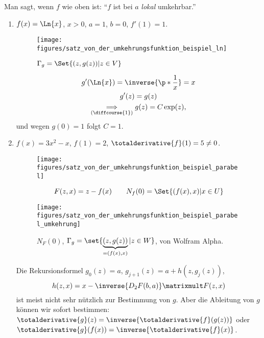 Man sagt, wenn \( f \) wie oben ist: \enquote{\( f \) ist bei \( a \) \emph{lokal} umkehrbar.}
\begin{beispiele}
  \begin{enumerate}
    \item \( f(x)= \Ln{x} \), \( x>0 \), \( a=1 \), \( b=0 \), \( f'(1)=1 \).
    \begin{figure}[H]
      \centering
      \texttt{[image: figures/satz\_von\_der\_umkehrungsfunktion\_beispiel\_ln]}
      \caption*{\textcolor{Blue}{\( \Gamma_g=\Set{(z,g(z))|z\in V} \)}}
      \label{fig:satz_von_der_umkehrungsfunktion_beispiel_ln}
    \end{figure}
    \begin{gather*}
      g'(\Ln{x})=\inverse{\p*{ \frac{1}{x} }}=x\\
      g'(z)=g(z)\\
      \underset{(\text{\diffcourse{1}})}{\implies} g(z)=C\exp (z),
    \end{gather*}
    und wegen \( g(0)=1 \) folgt \( C=1 \).
    \item \( f(x)=3x^2-x \), \( f(1)=2 \), \( \totalderivative{f}(1)=5\neq 0 \).
    \begin{figure}[H]
      \centering
      \texttt{[image: figures/satz\_von\_der\_umkehrungsfunktion\_beispiel\_parabel]}
      \label{fig:satz_von_der_umkehrungsfunktion_beispiel_parabel}
    \end{figure}
    \begin{equation*}
      F(z,x)=z-f(x)\qquad N_f(0)=\Set{(f(x),x)|x\in U}
    \end{equation*}
    \begin{figure}[H]
      \centering
      \texttt{[image: figures/satz\_von\_der\_umkehrungsfunktion\_beispiel\_parabel\_umkehrung]}
      \caption*{\( N_F(0) \), \textcolor{Blue}{\( \Gamma_g=\set{\underbrace{(z,g(z))}_{=(f(x),x)}|z\in W} \)}, von Wolfram Alpha.}
      \label{fig:satz_von_der_umkehrungsfunktion_beispiel_parabel_umkehrung}
    \end{figure}
    Die Rekursionsformel \( g_0(z)=a \), \( g_{j+1}(z)=a+h(z,g_j(z)) \),
    \begin{equation*}
      h(z,x)=x-\inverse{D_2 F(b,a)}\matrixmult F(z,x)
    \end{equation*}
    ist meist nicht sehr nützlich zur Bestimmung von \( g \). Aber die Ableitung von \( g \) können wir sofort bestimmen: \( \totalderivative{g}(z)=\inverse{\totalderivative{f}(g(z))} \) oder \( \totalderivative{g}(f(x))=\inverse{\totalderivative{f}(x)} \).


\end{enumerate}
\end{beispiele}
